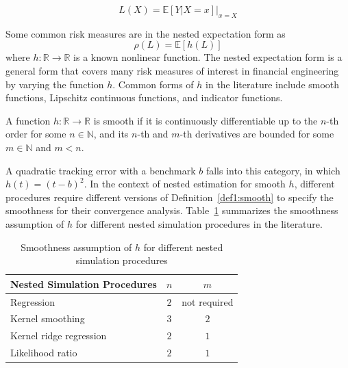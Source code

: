 $$ L(X) = \mathbb{E}\left[ Y|X=x \right]\vert_{x=X} $$

Some common risk measures are in the nested expectation form as
$$\rho(L) = \mathbb{E}\left[ h(L) \right]$$
where $h: \mathbb{R} \rightarrow \mathbb{R}$ is a known nonlinear function. 
The nested expectation form is a general form that covers many risk measures of interest in financial engineering by varying the function $h$.
Common forms of $h$ in the literature include smooth functions, Lipschitz continuous functions, and indicator functions.

\begin{definition} \label{def1:smooth}
    A function $h: \mathbb{R} \rightarrow \mathbb{R}$ is smooth if it is continuously differentiable up to the $n$-th order for some $n \in \mathbb{N}$, 
    and its $n$-th and $m$-th derivatives are bounded for some $m \in \mathbb{N}$ and $m < n$.
\end{definition}

A quadratic tracking error with a benchmark $b$ falls into this category, in which $h(t) = (t - b)^2$.
In the context of nested estimation for smooth $h$, different procedures require different versions of Definition~\ref{def1:smooth} to specify the smoothness for their convergence analysis.
Table~\ref{tab1:smoothness} summarizes the smoothness assumption of $h$ for different nested simulation procedures in the literature.

\begin{table}[ht!]
    \centering
    \begin{tabular}{lcc}
    \toprule
    \textbf{Nested Simulation Procedures} & $n$ & $m$ \\
    \midrule
    Regression & $2$ & not required \\
    Kernel smoothing & $3$ & $2$ \\
    Kernel ridge regression & $2$ & $1$ \\
    Likelihood ratio & $2$ & $1$ \\
    \bottomrule
    \end{tabular}
    \caption{Smoothness assumption of $h$ for different nested simulation procedures}
    \label{tab1:smoothness}
\end{table}

